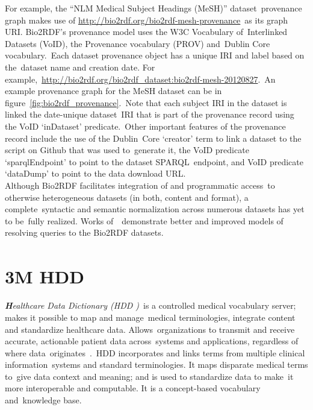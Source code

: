 \documentclass[DIV=calc, paper=a4, fontsize=12pt, onecolumn]{scrartcl}	 %
\newcommand{\initial}[1]{ %
\lettrine[lines=3,lhang=0.3,nindent=0em,slope=0em]{
\color{DarkBlue}
{\textbf{\textit{#1}}}}{}}
\begin{document}
  \noindent For example, the ``NLM Medical Subject Headings (MeSH)'' dataset\
  provenance graph makes use of \url{http://bio2rdf.org/bio2rdf-mesh-provenance}\
  as its graph URI. Bio2RDF's provenance model uses the W3C Vocabulary of\
  Interlinked Datasets (VoID), the Provenance vocabulary (PROV) and\
  Dublin Core vocabulary.\
  Each dataset provenance object has a unique IRI and label based on the\
  dataset name and creation date. For example,\
  \url{http://bio2rdf.org/bio2rdf_dataset:bio2rdf-mesh-20120827}.\
  An example provenance graph for the MeSH dataset can be in figure~\ref{fig:bio2rdf_provenance}.\
  Note that each subject IRI in the dataset is linked the date-unique dataset\
  IRI that is part of the provenance record using the VoID `inDataset' predicate.\
  Other important features of the provenance record include the use of the Dublin\
  Core `creator' term to link a dataset to the script on Github that was used to\
  generate it, the VoID predicate `sparqlEndpoint' to point to the dataset SPARQL\
  endpoint, and VoID predicate `dataDump' to point to the data download URL.\\
  
  \noindent Although Bio2RDF facilitates integration of and programmatic access\
  to otherwise heterogeneous datasets (in both, content and format), a complete\
  syntactic and semantic normalization across numerous datasets has yet to be\
  fully realized. Works of~\citep{ansell_model_2011, callahan_ontology-based_2013}\
  demonstrate better and improved models of resolving queries to the Bio2RDF datasets.\\


  \section[3M\textsuperscript{\texttrademark} Healthcare Data Dictionary (HDD)]
  {3M HDD\textsuperscript{\texttrademark}}
  \label{sec:hdd}
  
  \initial{H}\textit{ealthcare Data Dictionary (HDD )}\
  is a controlled medical vocabulary server; makes it possible to map and manage\
  medical terminologies, integrate content and standardize healthcare data. Allows\
  organizations to transmit and receive accurate, actionable patient data across\
  systems and applications, regardless of where data\
  originates~\citep{_3M_Healthcare_Data_Dictionary_2013}.\
  HDD incorporates and links terms from multiple clinical information\
  systems and standard terminologies. It maps disparate medical terms to\
  give data context and meaning; and is used to standardize data to make\
  it more interoperable and computable. It is a concept-based vocabulary and\
  knowledge base.\\
\end{document}
